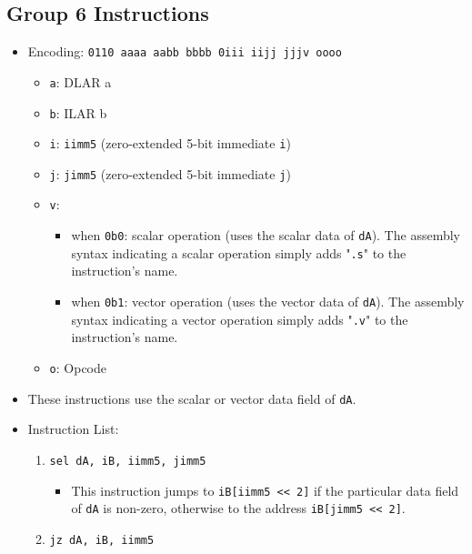 \documentclass{article}
\begin{document}
	\subsection{Group 6 Instructions}
		\begin{itemize}
		\item Encoding: \texttt{0110 aaaa aabb bbbb  0iii iijj jjjv oooo}
			\begin{itemize}
			\item \texttt{a}: DLAR a
			\item \texttt{b}: ILAR b
			\item \texttt{i}: \texttt{iimm5} (zero-extended 5-bit
				immediate \texttt{i})
			\item \texttt{j}: \texttt{jimm5} (zero-extended 5-bit
				immediate \texttt{j})
			\item \texttt{v}:
				\begin{itemize}
				\item when \texttt{0b0}: scalar operation (uses the scalar
					data of \texttt{dA}). The assembly syntax indicating a
					scalar operation simply adds "\texttt{.s}" to the
					instruction's name.
				\item when \texttt{0b1}: vector operation (uses the vector
					data of \texttt{dA}). The assembly syntax indicating a
					vector operation simply adds "\texttt{.v}" to the
					instruction's name.
				\end{itemize}
			\item \texttt{o}: Opcode
			\end{itemize}
		\item These instructions use the scalar or vector data field of
			\texttt{dA}.
		\item Instruction List:
			\begin{enumerate}
			\item \texttt{sel dA, iB, iimm5, jimm5}
				\begin{itemize}
				\item This instruction jumps to \texttt{iB[iimm5 << 2]} if
					the particular data field of \texttt{dA} is non-zero,
					otherwise to the address \texttt{iB[jimm5 << 2]}.
				\end{itemize}
			\item \texttt{jz dA, iB, iimm5}

\end{enumerate}
\end{itemize}
\end{document}
